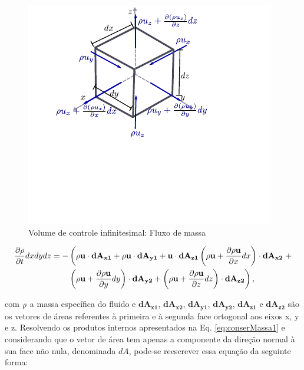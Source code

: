 \documentclass[tese_patricia]{subfiles}%
\begin{document}
\begin{figure}[htb!]
	\centering 
	\includegraphics[scale=1.5,trim=0cm 2.5cm 0cm 0.0cm, clip=true]{Imagens/Cap2/conserMassa.pdf}	
	\caption{Volume de controle infinitesimal: Fluxo de massa}
	\label{fig:VolInfi}
\end{figure}


\begin{align}
	\begin{split}
	\frac{\partial \rho}{\partial t}dxdydz &= -\left(\rho \mathbf{u} \cdot \mathbf{dA_{x1}}  +  \rho \mathbf{u} \cdot \mathbf{dA_{y1}} + \mathbf{u} \cdot \mathbf{dA_{z1}}  \left(\rho \mathbf{u} + \frac{\partial \rho \mathbf{u}}{\partial x}dx \right)\cdot \mathbf{dA_{x2}} \right. + \\&\qquad  \left.\left(\rho \mathbf{u} + \frac{\partial \rho \mathbf{u}}{\partial y}dy \right)\cdot \mathbf{dA_{y2}} + \left(\rho \mathbf{u} + \frac{\partial \rho \mathbf{u}}{\partial z}dz \right)\cdot \mathbf{dA_{z2}}\right), \label{eq:conserMassa1} 
	\end{split}
\end{align}

\noindent com $\rho$ a massa específica do fluido e $\mathbf{dA_{x1}}$, $\mathbf{dA_{x2}}$, $\mathbf{dA_{y1}}$, $\mathbf{dA_{y2}}$, $\mathbf{dA_{z1}}$ e $\mathbf{dA_{z2}}$ são os vetores de áreas referentes à primeira e à segunda face ortogonal aos eixos x, y e z.  Resolvendo os produtos internos apresentados na Eq. \ref{eq:conserMassa1} e considerando que o vetor de área tem apenas a componente da direção normal à sua face não nula, denominada $dA$, pode-se reescrever essa equação da seguinte forma:	
\end{document}
